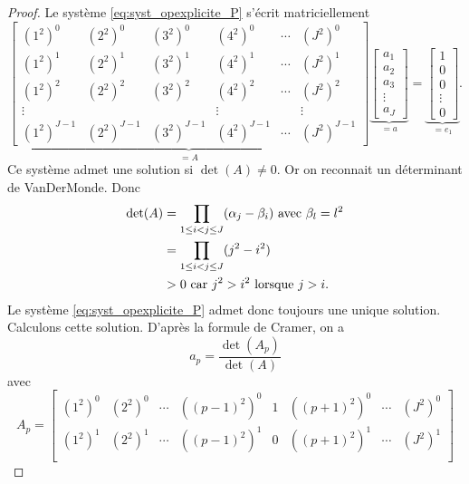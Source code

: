 \begin{proof}
Le système \eqref{eq:syst_opexplicite_P} s'écrit matriciellement
\begin{equation}
\underbrace{\begin{bmatrix}
(1^2)^0 & (2^2)^0 & (3^2)^0 & (4^2)^0 & \cdots & (J^2)^0\\
(1^2)^1 & (2^2)^1 & (3^2)^1 & (4^2)^1 & \cdots & (J^2)^1\\
(1^2)^2 & (2^2)^2 & (3^2)^2 & (4^2)^2 & \cdots & (J^2)^2\\
\vdots  &         &         & \vdots  &        &  \vdots\\
(1^2)^{J-1} & (2^2)^{J-1} & (3^2)^{J-1} & (4^2)^{J-1} & \cdots & (J^2)^{J-1}
\end{bmatrix}}_{= A}
\underbrace{\begin{bmatrix}
a_1 \\ a_2 \\ a_3 \\ \vdots \\ a_J
\end{bmatrix}
}_{=a} = \underbrace{\begin{bmatrix}
1 \\ 0 \\ 0 \\ \vdots \\ 0
\end{bmatrix}
}_{= e_1}.
\end{equation}
Ce système admet une solution si $\det (A) \neq 0$. Or on reconnait un déterminant de VanDerMonde. Donc
\begin{align*}
\det (A) & = \displaystyle\prod\limits_{1\leq i < j \leq J} (\alpha_j - \beta_i) \text{ avec } \beta_l = l^2 \\
	& = \displaystyle\prod\limits_{1\leq i < j \leq J} (j^2 - i^2)\\
	& > 0 \text{ car } j^2 > i^2 \text{ lorsque } j>i.
\end{align*}
Le système \eqref{eq:syst_opexplicite_P} admet donc toujours une unique solution. Calculons cette solution. D'après la formule de Cramer, on a 
\begin{equation}
a_p = \dfrac{\det (A_p)}{\det (A)}
\end{equation}
avec
\begin{equation}
A_p = \begin{bmatrix}
(1^2)^0 & (2^2)^0 & \cdots & ((p-1)^2)^0 & 1 & ((p+1)^2)^0 & \cdots & (J^2)^0 \\ 
(1^2)^1 & (2^2)^1 & \cdots & ((p-1)^2)^1 & 0 & ((p+1)^2)^1 & \cdots & (J^2)^1 \\

\end{bmatrix}
\end{equation}
\end{proof}
